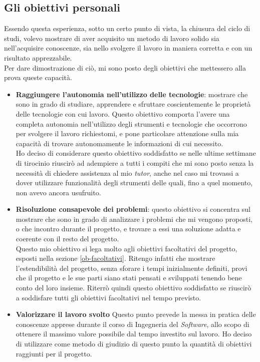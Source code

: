 \subsection{Gli obiettivi personali}
\noindent
Essendo questa esperienza, sotto un certo punto di vista, la chiusura del ciclo di studi, volevo  mostrare di aver acquisito un metodo di lavoro solido sia nell'acquisire conoscenze, sia nello svolgere il lavoro in maniera corretta e con un risultato apprezzabile.\\
\noindent
Per dare dimostrazione di ciò, mi sono posto degli obiettivi che mettessero alla prova queste capacità.\\
\begin{itemize}
    \itemsep0em
	\item \textbf{Raggiungere l'autonomia nell'utilizzo delle tecnologie}: mostrare che sono in grado di studiare, apprendere e sfruttare coscientemente le proprietà delle tecnologie con cui lavoro.
	Questo obiettivo comporta l'avere una completa autonomia nell'utilizzo degli strumenti e tecnologie che occorrono per svolgere il lavoro richiestomi, e pone particolare attenzione sulla mia capacità di trovare autonomamente le informazioni di cui necessito.\\
	Ho deciso di considerare questo obiettivo soddisfatto se nelle ultime settimane di tirocinio riuscirò ad adempiere a tutti i compiti che mi sono posto senza la necessità di chiedere assistenza al mio \textit{tutor}, anche nel caso mi trovassi a dover utilizzare funzionalità degli strumenti delle quali, fino a quel momento, non avevo ancora usufruito.
	\item \textbf{Risoluzione consapevole dei problemi}: questo obiettivo si concentra sul mostrare che sono in grado di analizzare i problemi che mi vengono proposti, o che incontro durante il progetto, e trovare a essi una soluzione adatta e coerente con il resto del progetto.\\
	Questo mio obiettivo si lega molto agli obiettivi facoltativi del progetto, esposti nella sezione \ref{ob-facoltativi}.
	Ritengo infatti che mostrare l'estendibilità del progetto, senza sforare i tempi inizialmente definiti, provi che il progetto e le sue parti siano stati pensati e sviluppati tenendo bene conto del loro insieme.
	Riterrò quindi questo obiettivo soddisfatto se riuscirò a soddisfare tutti gli obiettivi facoltativi nel tempo previsto.
	\item \textbf{Valorizzare il lavoro svolto}
	Questo punto prevede la messa in pratica delle conoscenze apprese durante il corso di Ingegneria del \textit{Software}, allo scopo di ottenere il massimo valore possibile dal tempo investito sul lavoro.
	Ho deciso di utilizzare come metodo di giudizio di questo punto la quantità di obiettivi raggiunti per il progetto.

\end{itemize}
